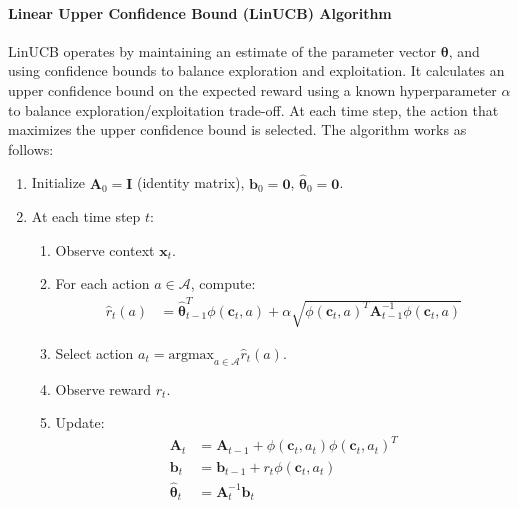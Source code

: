 \paragraph{Linear Upper Confidence Bound (LinUCB) Algorithm}
LinUCB operates by maintaining an estimate of the parameter vector $\boldsymbol{\theta}$, and using confidence bounds to balance exploration and exploitation. It calculates an upper confidence bound on the expected reward using a known hyperparameter $\alpha$ to balance exploration/exploitation trade-off. At each time step, the action that maximizes the upper confidence bound is selected. The algorithm works as follows:
    \begin{enumerate}
        \item Initialize $\mathbf{A}_0 = \mathbf{I}$ (identity matrix), $\mathbf{b}_0 = \mathbf{0}$, $\hat{\boldsymbol{\theta}}_0 = \mathbf{0}$.
        \item At each time step $t$:
          \begin{enumerate}
              \item Observe context $\mathbf{x}_t$.
              \item For each action $a \in \mathcal{A}$, compute:
              \begin{align*}
                \hat{r}_t(a) &= \hat{\boldsymbol{\theta}}_{t-1}^T \phi(\mathbf{c}_t, a) + \alpha \sqrt{ \phi(\mathbf{c}_t, a)^T \mathbf{A}_{t-1}^{-1} \phi(\mathbf{c}_t, a)}
              \end{align*}
              \item Select action $a_t = \text{argmax}_{a \in \mathcal{A}} \hat{r}_t(a)$.
              \item Observe reward $r_t$.
              \item Update:
              \begin{align*}
                  \mathbf{A}_t &= \mathbf{A}_{t-1} + \phi(\mathbf{c}_t, a_t) \phi(\mathbf{c}_t, a_t)^T \\
                  \mathbf{b}_t &= \mathbf{b}_{t-1} + r_t \phi(\mathbf{c}_t, a_t) \\
                  \hat{\boldsymbol{\theta}}_t &= \mathbf{A}_t^{-1} \mathbf{b}_t
              \end{align*}
          \end{enumerate}
    \end{enumerate}
